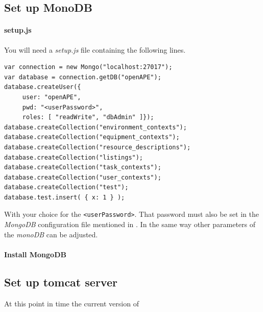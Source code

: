 \documentclass[10pt]{article}
\begin{document}
\subsection{Set up MonoDB}
\paragraph{setup.js} You will need a \emph{setup.js} file containing the following lines.
\begin{lstlisting}
var connection = new Mongo("localhost:27017");
var database = connection.getDB("openAPE");
database.createUser({
     user: "openAPE",
     pwd: "<userPassword>",
     roles: [ "readWrite", "dbAdmin" ]});
database.createCollection("environment_contexts");
database.createCollection("equipment_contexts");
database.createCollection("resource_descriptions");
database.createCollection("listings");
database.createCollection("task_contexts");
database.createCollection("user_contexts");
database.createCollection("test");
database.test.insert( { x: 1 } );
\end{lstlisting}
With your choice for the \texttt{<userPassword>}. That password must also be set in the \emph{MongoDB} configuration file mentioned in . In the same way other parameters of the \emph{monoDB} can be adjusted.
\paragraph{Install MongoDB} 
\subsection{Set up tomcat server} At this point in time the current version of 
\end{document}
